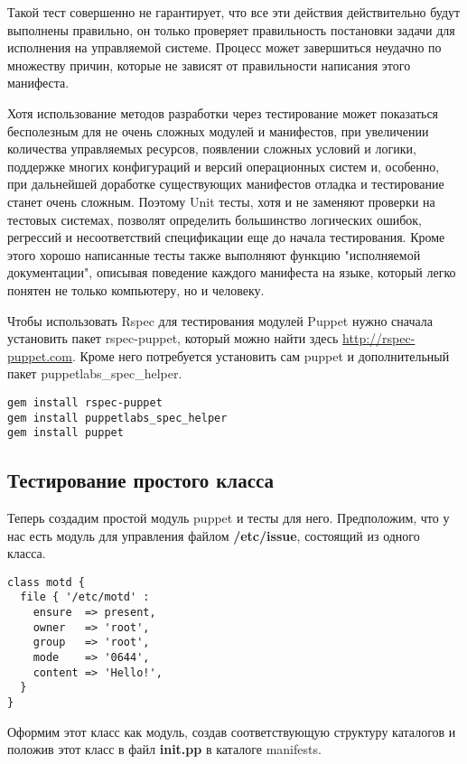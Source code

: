 Такой тест совершенно не гарантирует, что все эти действия действительно будут выполнены правильно, он только проверяет правильность постановки задачи для исполнения на управляемой системе. Процесс может завершиться неудачно по множеству причин, которые не зависят от правильности написания этого манифеста.

Хотя использование методов разработки через тестирование может показаться бесполезным для не очень сложных модулей и манифестов, при увеличении количества управляемых ресурсов, появлении сложных условий и логики, поддержке многих конфигураций и версий операционных систем и, особенно, при дальнейшей доработке существующих манифестов отладка и тестирование станет очень сложным. Поэтому Unit тесты, хотя и не заменяют проверки на тестовых системах, позволят определить большинство логических ошибок, регрессий и несоответствий спецификации еще до начала тестирования. Кроме этого хорошо написанные тесты также выполняют функцию "исполняемой документации", описывая поведение каждого манифеста на языке, который легко понятен не только компьютеру, но и человеку.

Чтобы использовать Rspec для тестирования модулей Puppet нужно сначала установить пакет rspec-puppet, который можно найти здесь \url{http://rspec-puppet.com}. Кроме него потребуется установить сам puppet и дополнительный пакет puppetlabs\_spec\_helper.

\begin{verbatim}
gem install rspec-puppet
gem install puppetlabs_spec_helper
gem install puppet
\end{verbatim}

\subsection{Тестирование простого класса}

Теперь создадим простой модуль puppet и тесты для него. Предположим, что у нас есть модуль для управления файлом \textbf{/etc/issue}, состоящий из одного класса.

\begin{lstlisting}
class motd {
  file { '/etc/motd' :
    ensure  => present,
    owner   => 'root',
    group   => 'root',
    mode    => '0644',
    content => 'Hello!',
  }
}
\end{lstlisting}

Оформим этот класс как модуль, создав соответствующую структуру каталогов и положив этот класс в файл \textbf{init.pp} в каталоге manifests.

